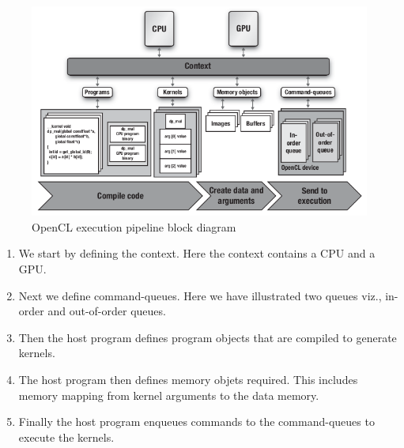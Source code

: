 \begin{figure}[H]
  \centering
  \includegraphics[scale=0.6]{./images/OpenCL_basic_execution_pipeline.png}
  \caption{OpenCL execution pipeline block diagram}
  \label{}
\end{figure}

\begin{enumerate}
	\item We start by defining the context. Here the context contains a CPU and a GPU.
	\item Next we define command-queues. Here we have illustrated two queues viz., in-order and out-of-order queues.
	\item Then the host program defines program objects that are compiled to generate kernels.
	\item The host program then defines memory objets required. This includes memory mapping from kernel arguments to the data memory.
	\item Finally the host program enqueues commands to the command-queues to execute the kernels.
\end{enumerate}
